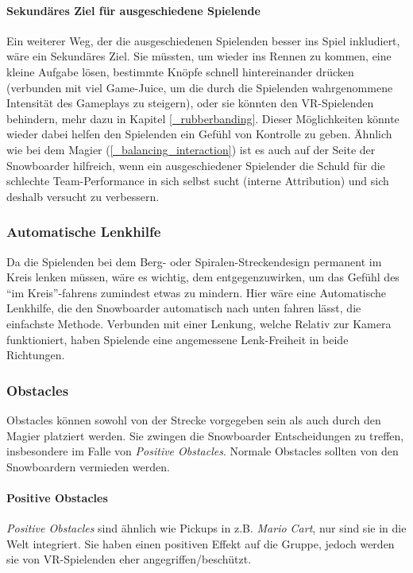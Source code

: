 \paragraph{Sekundäres Ziel für ausgeschiedene Spielende}
Ein weiterer Weg, der die ausgeschiedenen Spielenden besser ins Spiel inkludiert, wäre ein Sekundäres Ziel. Sie müssten, um wieder ins Rennen zu kommen, eine kleine Aufgabe lösen, bestimmte Knöpfe schnell hintereinander drücken (verbunden mit viel Game-Juice, um die durch die Spielenden wahrgenommene Intensität des Gameplays zu steigern), oder sie könnten den VR-Spielenden behindern, mehr dazu in Kapitel \ref{_rubberbanding}. Dieser Möglichkeiten könnte wieder dabei helfen den Spielenden ein Gefühl von Kontrolle zu geben. Ähnlich wie bei dem Magier (\ref{_balancing_interaction}) ist es auch auf der Seite der Snowboarder hilfreich, wenn ein ausgeschiedener Spielender die Schuld für die schlechte Team-Performance in sich selbst sucht (interne Attribution) und sich deshalb versucht zu verbessern.

\subsubsection{Automatische Lenkhilfe}
Da die Spielenden bei dem Berg- oder Spiralen-Streckendesign permanent im Kreis lenken müssen, wäre es wichtig, dem entgegenzuwirken, um das Gefühl des "`im Kreis"'-fahrens zumindest etwas zu mindern. Hier wäre eine Automatische Lenkhilfe, die den Snowboarder automatisch nach unten fahren lässt, die einfachste Methode. Verbunden mit einer Lenkung, welche Relativ zur Kamera funktioniert, haben Spielende eine angemessene Lenk-Freiheit in beide Richtungen.

\subsubsection{Obstacles}
Obstacles können sowohl von der Strecke vorgegeben sein als auch durch den Magier platziert werden. Sie zwingen die Snowboarder Entscheidungen zu treffen, insbesondere im Falle von \emph{Positive Obstacles}. Normale Obstacles sollten von den Snowboardern vermieden werden.

\paragraph{Positive Obstacles\label{_positive_obstacles}}
\emph{Positive Obstacles} sind ähnlich wie Pickups in z.B. \emph{Mario Cart}, nur sind sie in die Welt integriert. Sie haben einen positiven Effekt auf die Gruppe, jedoch werden sie von VR-Spielenden eher angegriffen/beschützt.

